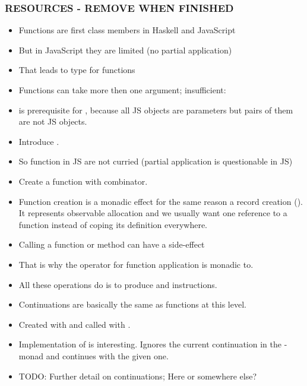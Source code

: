 \subsubsection{RESOURCES - REMOVE WHEN FINISHED}

\begin{itemize}
\item Functions are first class members in Haskell and JavaScript
\item But in JavaScript they are limited (no partial application)
\item That leads to type for functions 
\item Functions can take more then one argument;  insufficient: 
\item {} is prerequisite for ,
because all JS objects are parameters but pairs of them are not 
JS objects.
\item Introduce .
\item So function in JS are not curried (partial application is questionable in JS)
\item Create a function with  combinator.
\item Function creation is a monadic effect for the same reason 
a record creation (). It represents observable
allocation and we usually want one reference to a function 
instead of coping its definition everywhere.
\item Calling a function or method can have a side-effect
\item That is why the operator \Src{\$\$} for function application is monadic to.
\item All these operations do is to produce  and 
instructions.
\item Continuations are basically the same as functions at this level.
\item Created with  and called with .
\item Implementation of  is interesting. Ignores 
the current continuation in the \JS-monad and continues with the given one.
\item TODO: Further detail on continuations; Here or somewhere else?
\end{itemize}






